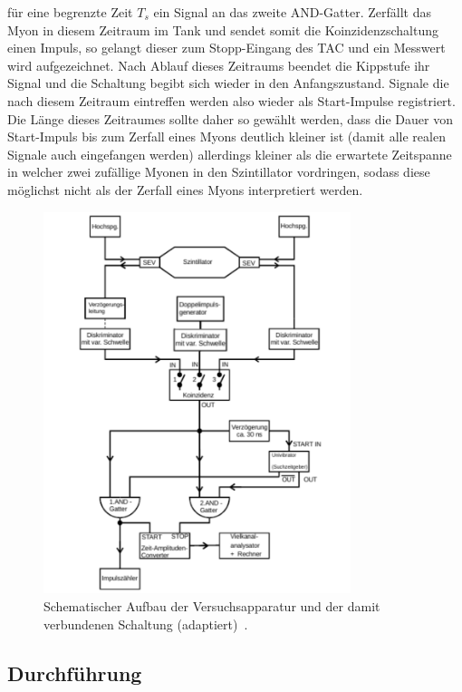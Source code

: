 für eine begrenzte Zeit $T_s$ ein Signal an das zweite AND-Gatter. Zerfällt das
Myon in diesem Zeitraum im Tank und sendet somit die Koinzidenzschaltung einen
Impuls, so gelangt dieser zum Stopp-Eingang des TAC und ein Messwert wird
aufgezeichnet. Nach Ablauf dieses Zeitraums beendet die Kippstufe ihr Signal und
die Schaltung begibt sich wieder in den Anfangszustand. Signale die nach diesem
Zeitraum eintreffen werden also wieder als Start-Impulse registriert. Die Länge
dieses Zeitraumes sollte daher so gewählt werden, dass die Dauer von Start-Impuls
bis zum Zerfall eines Myons deutlich kleiner ist (damit alle realen Signale
auch eingefangen werden) allerdings kleiner als die erwartete Zeitspanne in
welcher zwei zufällige Myonen in den Szintillator vordringen, sodass diese
möglichst nicht als der Zerfall eines Myons interpretiert werden.

\begin{figure}[htb]
  \centering
  \includegraphics[width=0.8\textwidth]{figures/versuchsaufbau_adapt.pdf}
  \caption{Schematischer Aufbau der Versuchsapparatur und der damit verbundenen Schaltung (adaptiert)~\cite{V01}.}
  \label{fig:aufbau}
\end{figure}

\subsection{Durchführung}

